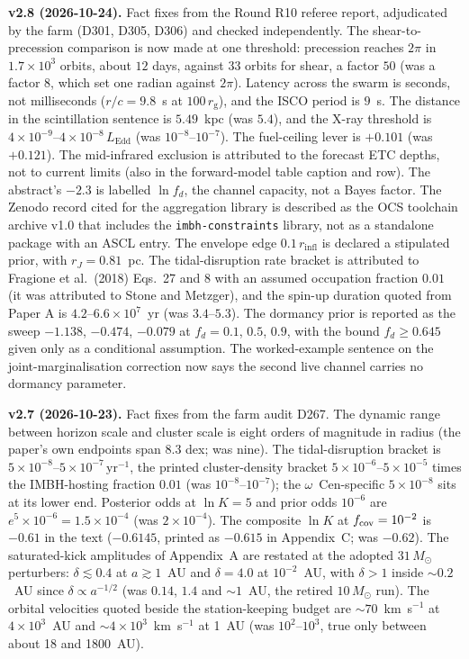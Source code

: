 \documentclass[11pt]{article}
\newcommand{\msun}{\ensuremath{M_\odot}}
\newcommand{\ocen}{\ensuremath{\omega}~Cen}
\newcommand{\rg}{\ensuremath{r_{\mathrm{g}}}}
\newcommand{\lnK}{\ensuremath{\ln K}}
\begin{document}
\textbf{v2.8 (2026-10-24).} Fact fixes from the Round R10 referee report, adjudicated by the farm (D301, D305, D306) and checked independently. The shear-to-precession comparison is now made at one threshold: precession reaches $2\pi$ in $1.7\times10^{3}$ orbits, about $12$ days, against $33$ orbits for shear, a factor $50$ (was a factor $8$, which set one radian against $2\pi$). Latency across the swarm is seconds, not milliseconds ($r/c = 9.8$~s at $100\,\rg$), and the ISCO period is $9$~s. The distance in the scintillation sentence is $5.49$~kpc (was $5.4$), and the X-ray threshold is $4\times10^{-9}$--$4\times10^{-8}\,L_{\mathrm{Edd}}$ (was $10^{-8}$--$10^{-7}$). The fuel-ceiling lever is $+0.101$ (was $+0.121$). The mid-infrared exclusion is attributed to the forecast ETC depths, not to current limits (also in the forward-model table caption and row). The abstract's $-2.3$ is labelled $\ln f_{d}$, the channel capacity, not a Bayes factor. The Zenodo record cited for the aggregation library is described as the OCS toolchain archive v1.0 that includes the \texttt{imbh-constraints} library, not as a standalone package with an ASCL entry. The envelope edge $0.1\,r_{\mathrm{infl}}$ is declared a stipulated prior, with $r_{J} = 0.81$~pc. The tidal-disruption rate bracket is attributed to Fragione et al.\ (2018) Eqs.~27 and 8 with an assumed occupation fraction $0.01$ (it was attributed to Stone and Metzger), and the spin-up duration quoted from Paper A is $4.2$--$6.6\times10^{7}$~yr (was $3.4$--$5.3$). The dormancy prior is reported as the sweep $-1.138$, $-0.474$, $-0.079$ at $f_{d} = 0.1$, $0.5$, $0.9$, with the bound $f_{d} \geq 0.645$ given only as a conditional assumption. The worked-example sentence on the joint-marginalisation correction now says the second live channel carries no dormancy parameter.

\textbf{v2.7 (2026-10-23).} Fact fixes from the farm audit D267. The dynamic range between horizon scale and cluster scale is eight orders of magnitude in radius (the paper's own endpoints span 8.3 dex; was nine). The tidal-disruption bracket is $5\times10^{-8}$--$5\times10^{-7}\,\mathrm{yr^{-1}}$, the printed cluster-density bracket $5\times10^{-6}$--$5\times10^{-5}$ times the IMBH-hosting fraction $0.01$ (was $10^{-8}$--$10^{-7}$); the \ocen-specific $5\times10^{-8}$ sits at its lower end. Posterior odds at $\lnK = 5$ and prior odds $10^{-6}$ are $e^{5}\times10^{-6} = 1.5\times10^{-4}$ (was $2\times10^{-4}$). The composite $\lnK$ at $f_{\rm cov} = 10^{-2}$ is $-0.61$ in the text ($-0.6145$, printed as $-0.615$ in Appendix~C; was $-0.62$). The saturated-kick amplitudes of Appendix~A are restated at the adopted $31\,\msun$ perturbers: $\delta \lesssim 0.4$ at $a \gtrsim 1$~AU and $\delta = 4.0$ at $10^{-2}$~AU, with $\delta > 1$ inside $\sim 0.2$~AU since $\delta \propto a^{-1/2}$ (was $0.14$, $1.4$ and $\sim 1$~AU, the retired $10\,\msun$ run). The orbital velocities quoted beside the station-keeping budget are $\sim 70$~km~s$^{-1}$ at $4\times10^{3}$~AU and $\sim 4\times10^{3}$~km~s$^{-1}$ at 1~AU (was $10^{2}$--$10^{3}$, true only between about 18 and 1800~AU).
\end{document}
